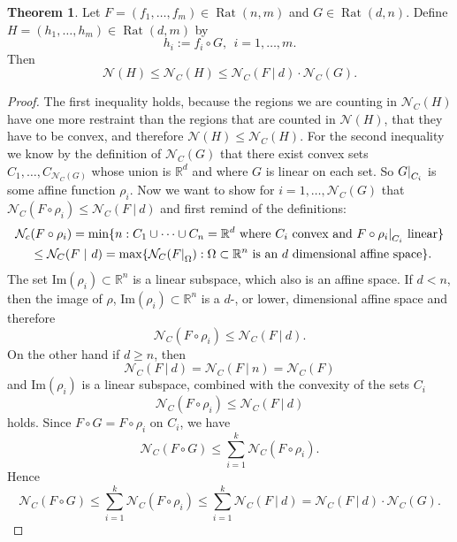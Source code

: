 \documentclass{article}
\theoremstyle{definition}
\newtheorem{theorem}{Theorem}[section]
\DeclareMathOperator{\Rat}{Rat}
\newcommand\restr[2]{{%
  \left.\kern-\nulldelimiterspace %
  #1 %
  \right|_{#2} %
  }}
\begin{document}
\begin{theorem}\hspace{1sp}\cite{zhang2018tropical}\label{theo:inequal}
Let $F=(f_1, \dots , f_m) \in \Rat(n,m)$ and $G \in \Rat(d, n)$. Define $H = (h_1, \dots , h_m) \in \Rat(d, m)$ by
$$h_i := f_i \circ G, \ \ i=1, \dots , m.$$
Then
$$\mathcal{N}(H) \leq \mathcal{N}_{C}(H) \leq \mathcal{N}_C(F \ | \ d) \cdot \mathcal{N}_C(G).$$
\end{theorem}
\begin{proof}
The first inequality holds, because the regions we are counting in $\mathcal{N}_{C}(H)$ have one more restraint than the regions that are counted in $\mathcal{N}(H)$, that they have to be convex, and therefore $\mathcal{N}(H) \leq \mathcal{N}_{C}(H)$. For the second inequality we know by the definition of $\mathcal{N}_C(G)$ that there exist convex sets $C_1, \dots , C_{\mathcal{N}_C(G)}$ whose union is $\mathbb{R}^{d}$ and where $G$ is linear on each set. So $\restr{G}{C_i}$ is some affine function $\rho_i$. Now we want to show for $i = 1, \dots, \mathcal{N}_C(G)$ that $\mathcal{N}_C(F \circ \rho_i) \leq \mathcal{N}_C(F \ | \ d)$ and first remind of the definitions:
\begin{align*}
\mathcal{N}_{c}&(F \circ \rho_i) = \min\{n : C_1 \cup \dots \cup C_n = \mathbb{R}^{d} \ \text{where} \ C_i \ \text{convex and} \ \restr{F \circ \rho_i}{C_i} \ \text{linear}\} \\
&\leq \mathcal{N}_C(F \ | \ d) = \max\{\mathcal{N}_C(\restr{F}{\Omega}) : \Omega \subset \mathbb{R}^{n} \ \text{is an} \ d \ \text{dimensional affine space} \}.
\end{align*}
The set $\text{Im}(\rho_i) \subset \mathbb{R}^{n}$ is a linear subspace, which also is an affine space. If $d < n$, then the image of $\rho$, $\text{Im}(\rho_i) \subset \mathbb{R}^{n}$ is a $d$-, or lower, dimensional affine space and therefore 
$$\mathcal{N}_C(F \circ \rho_i) \leq \mathcal{N}_C(F \ | \ d).$$ 
On the other hand if $d \geq n$, then 
$$\mathcal{N}_C(F \ | \ d) = \mathcal{N}_C(F \ | \ n) = \mathcal{N}_C(F)$$ 
and $\text{Im}(\rho_i)$ is a linear subspace, combined with the convexity of the sets $C_i$
$$\mathcal{N}_C(F \circ \rho_i) \leq \mathcal{N}_C(F \ | \ d)$$
holds. Since $F \circ G = F \circ \rho_i$ on $C_i$, we have
$$\mathcal{N}_C(F \circ G) \leq \displaystyle\sum_{i=1}^{k} \mathcal{N}_C(F \circ \rho_i).$$
Hence
$$\mathcal{N}_C(F \circ G) \leq \displaystyle\sum_{i=1}^{k} \mathcal{N}_C(F \circ \rho_i) \leq \displaystyle\sum_{i=1}^{k} \mathcal{N}_C(F \ | \ d) = \mathcal{N}_C(F \ | \ d) \cdot \mathcal{N}_C(G).$$
\end{proof}
\end{document}
